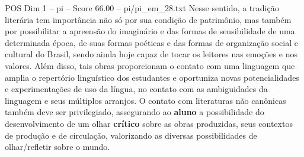 \begin{textsample}{POS Dim 1 – pi – Score 66.00 – pi/pi\_em\_28.txt}
Nesse sentido, a tradição literária tem importância não só por sua condição de patrimônio, mas também por possibilitar a apreensão do imaginário e das formas de sensibilidade de uma determinada época, de suas formas poéticas e das formas de organização social e cultural do Brasil, sendo ainda hoje capaz de tocar os leitores nas emoções e nos valores.
Além disso, tais obras proporcionam o contato com uma linguagem que amplia o repertório linguístico dos estudantes e oportuniza novas potencialidades e experimentações de uso da língua, no contato com as ambiguidades da linguagem e seus múltiplos arranjos.
O contato com literaturas não canônicas também deve ser privilegiado, assegurando ao \textbf{aluno} a possibilidade do desenvolvimento de um olhar \textbf{crítico} sobre as obras produzidas, seus contextos de produção e de circulação, valorizando as diversas possibilidades de olhar/refletir sobre o mundo.

\end{textsample}
